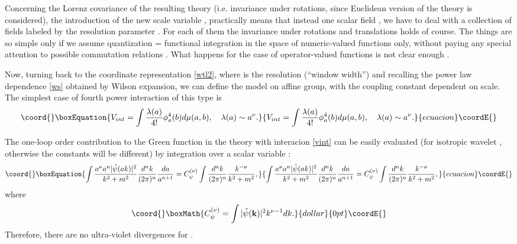 \documentclass[a4paper,a4paper]{article}
\def\bvec#1{\mathbf{#1}}
\def\dk#1#2{\frac{ d^{#2}{#1} }{ (2\pi)^{#2} }} %
\def\da#1#2{\frac{ d{#1}}{{#1}^{{#2}+1}}}
\begin{document}
Concerning the Lorenz covariance of the resulting theory (i.e. invariance 
under rotations, since Euclidean version of the theory is considered), the  
introduction of the new scale variable \coordHE{}, practically means that instead 
one scalar field \coordHE{}, we have to deal with a collection of fields 
labeled by the resolution parameter \coordHE{}. For each of them 
the invariance under rotations and translations holds of course. The things 
are so simple only if we assume quantization = functional integration 
in the space of numeric-valued functions only, without paying any special 
attention to possible commutation relations \coordHE{}.
What happens for the case of operator-valued functions is not clear enough 
\cite{Federbush}.   

Now, turning back to the coordinate representation \eqref{wtl2}, where 
\coordHE{} is the resolution (``window width'') and recalling the power law 
dependence \eqref{ws} obtained by Wilson expansion, we can define the 
\coordHE{} model on affine group, with the coupling constant 
dependent on scale. The simplest case of fourth power interaction 
of this type is
\begin{equation}\coord{}\boxEquation{ 
V_{int} =\int \frac{\lambda(a)}{4!} \phi^4_a(b) d\mu(a,b),
\quad  \lambda(a)\sim a^\nu.
\label{vint}
}{ 
V_{int} =\int \frac{\lambda(a)}{4!} \phi^4_a(b) d\mu(a,b),
\quad  \lambda(a)\sim a^\nu.
}{ecuacion}\coordE{}\end{equation}

The one-loop order contribution to the Green function \coordHE{} 
in the theory with interacion \eqref{vint}
can be easily evaluated 
(for isotropic wavelet \coordHE{}, otherwise 
the constants will be different) by integration over a scalar variable 
\coordHE{}: 
\begin{equation}\coord{}\boxEquation{
\int \frac{a^\nu a^n |\hat\psi(ak)|^2 }{k^2+m^2}\dk{k}{n}\da{a}{n}  
= C_\psi^{(\nu)}  \int \dk{k}{n} \frac{k^{-\nu}}{k^2+m^2}, 
}{
\int \frac{a^\nu a^n |\hat\psi(ak)|^2 }{k^2+m^2}\dk{k}{n}\da{a}{n}  
= C_\psi^{(\nu)}  \int \dk{k}{n} \frac{k^{-\nu}}{k^2+m^2}, 
}{ecuacion}\coordE{}\end{equation} 
where $$\coord{}\boxMath{C_\psi^{(\nu)}=\int |\hat\psi(\bvec{k})|^2 k^{\nu-1}dk.}{dollar}{0pt}\coordE{}$$ 
Therefore, there are no ultra-violet divergences for \coordHE{}. 
\end{document}
